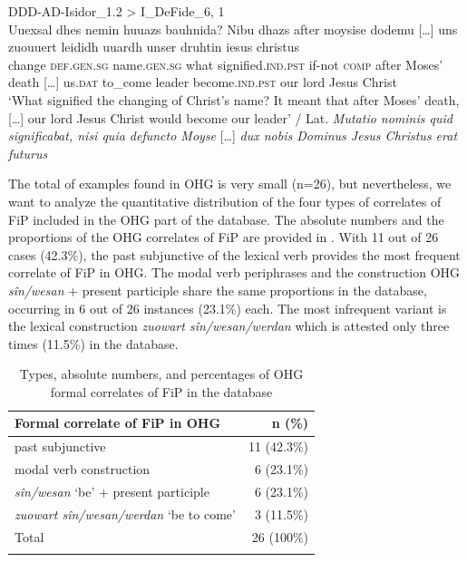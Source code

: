 \documentclass[output=paper,colorlinks,citecolor=brown]{langscibook}
\begin{document}
\ex \label{ex:petrova_chen:petrova_chen:14b} DDD-AD-Isidor\_1.2 > I\_DeFide\_6, 1\\
\gll Uuexsal dhes nemin huuazs bauhnida? Nibu dhazs after moysise dodemu […] uns zuouuert leididh uuardh unser druhtin iesus christus\\
change \textsc{def.gen.sg} name.\textsc{gen.sg} what signified.\textsc{ind.pst} if-not \textsc{comp} after Moses’ death […] us.\textsc{dat} to\_come leader become.\textsc{ind.pst} our lord Jesus Christ\\
\glt ‘What signified the changing of Christ’s name? It meant that after Moses’ death, […] our lord Jesus Christ would become our leader’ / Lat. \textit{Mutatio nominis quid significabat, nisi quia defuncto Moyse }[…]\textit{ dux nobis Dominus Jesus Christus erat futurus}
\z
\z

The total of examples found in OHG is very small (n=26), but nevertheless, we want to analyze the quantitative distribution of the four types of correlates of FiP included in the OHG part of the database. The absolute numbers and the proportions of the OHG correlates of FiP are provided in . With 11 out of 26 cases (42.3\%), the past subjunctive of the lexical verb provides the most frequent correlate of FiP in OHG. The modal verb periphrases and the construction OHG \textit{sîn/wesan} + present participle share the same proportions in the database, occurring in 6 out of 26 instances (23.1\%) each. The most infrequent variant is the lexical construction \textit{zuowart sîn/wesan/werdan} which is attested only three times (11.5\%) in the database.

\begin{table}
    \centering
    \begin{tabularx}{\textwidth}{Qr}
        \lsptoprule
        {Formal correlate of FiP in OHG} & {n (\%)} \\
        \midrule
        past subjunctive & 11 (42.3\%) \\
        modal verb construction & 6 (23.1\%) \\
        \textit{sîn/wesan} ‘be’ + present participle & 6 (23.1\%) \\
        \textit{zuowart sîn/wesan/werdan} ‘be to come’ & 3 (11.5\%) \\
        \midrule
        {Total} & 26 (100\%) \\
        \lspbottomrule
    \end{tabularx}
    \caption{Types, absolute numbers, and percentages of OHG formal correlates of FiP in the database}
    \label{tab:2}
\end{table}
\end{document}

